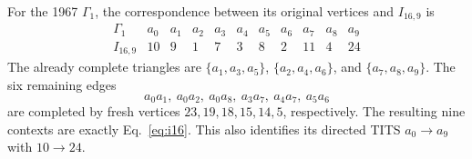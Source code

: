 \documentclass[aps,pra,reprint,superscriptaddress,longbibliography,nofootinbib,floatfix,10pt]{revtex4-2}
\theoremstyle{definition}
\begin{document}
For the 1967 $\Gamma_1$\cite[pp.~68,70]{kochen1}, the correspondence
between its original vertices and $I_{16,9}$ is
\[
\begin{array}{c|rrrrrrrrrr}
 \Gamma_1&a_0&a_1&a_2&a_3&a_4&a_5&a_6&a_7&a_8&a_9\\\hline
 I_{16,9}&10&9&1&7&3&8&2&11&4&24
\end{array}
\]
The already complete triangles are
$\{a_1,a_3,a_5\}$, $\{a_2,a_4,a_6\}$, and
$\{a_7,a_8,a_9\}$. The six remaining edges
\[
 a_0a_1,\ a_0a_2,\ a_0a_8,\ a_3a_7,\ a_4a_7,\ a_5a_6
\]
are completed by fresh vertices $23,19,18,15,14,5$, respectively.
The resulting nine contexts are exactly Eq.~\eqref{eq:i16}.
This also identifies its directed TITS $a_0\to a_9$ with $10\to24$.



\end{document}

